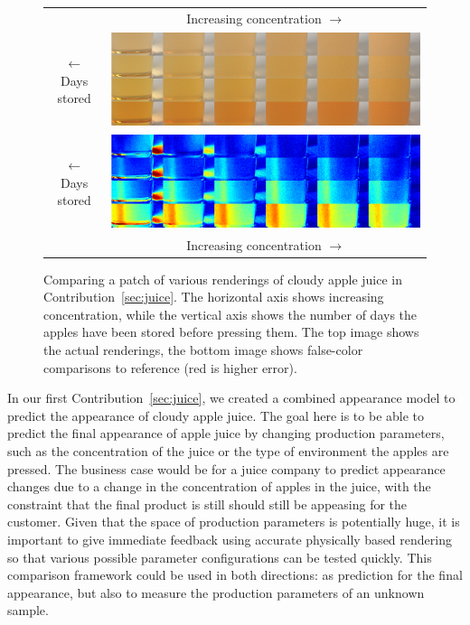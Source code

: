 \begin{figure}[t]
\centering
\begin{tabular}{@{}c@{}c@{}}
	 & Increasing concentration $\longrightarrow$ \\
	\begin{sideways}\hspace{1em}$\longleftarrow$ Days stored \end{sideways} \hspace{0.5mm} &\includegraphics[width=0.9\columnwidth]{figures/comparison_renderings.png} \\
	 \begin{sideways}\hspace{1em}$\longleftarrow$ Days stored \end{sideways} \hspace{0.5mm} &\includegraphics[width=0.9\columnwidth]{figures/comparison_diff.png}  \\
	 & Increasing concentration $\longrightarrow$

\end{tabular}
\caption{Comparing a patch of various renderings of cloudy apple juice in Contribution~\ref{sec:juice}. The horizontal axis shows increasing concentration, while the vertical axis shows the number of days the apples have been stored before pressing them. The top image shows the actual renderings, the bottom image shows false-color comparisons to reference (red is higher error).}
\label{fig:juicecomparisondetail}
\end{figure}

In our first Contribution~\ref{sec:juice}, we created a combined appearance model to predict the appearance of cloudy apple juice. The goal here is to be able to predict the final appearance of apple juice by changing production parameters, such as the concentration of the juice or the type of environment the apples are pressed. The business case would be for a juice company to predict appearance changes due to a change in the concentration of apples in the juice, with the constraint that the final product is still should still be appeasing for the customer. Given that the space of production parameters is potentially huge, it is important to give immediate feedback using accurate physically based rendering so that various possible parameter configurations can be tested quickly. This comparison framework could be used in both directions: as prediction for the final appearance, but also to measure the production parameters of an unknown sample. 

